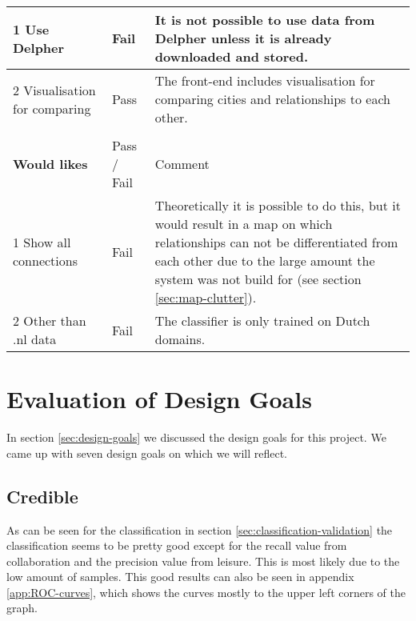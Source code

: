 \begin{table}[H]
\begin{tabular}{ll m{8cm}}
1 Use Delpher                  & Fail        & It is not possible to use data from Delpher unless it is already downloaded and stored.                                                                                                                                               \\ \hline
2 Visualisation for comparing  & Pass        & The front-end includes visualisation for comparing cities and relationships to each other.                                                                                                                                            \\
                               &             &                                                                                                                                                                                                                                       \\
\textbf{Would likes}                    & Pass / Fail & Comment                                                                                                                                                                                                                               \\
1 Show all connections         & Fail        & Theoretically it is possible to do this, but it would result in a map on which relationships can not be differentiated from each other due to the large amount the system was not build for (see section \ref{sec:map-clutter}). \\ \hline
2 Other than .nl data          & Fail        & The classifier is only trained on Dutch domains.                                                                 
\end{tabular}
\end{table}

\section{Evaluation of Design Goals}
In section \ref{sec:design-goals} we discussed the design goals for this project. We came up with seven design goals on which we will reflect.

\subsection{Credible}
As can be seen for the classification in section \ref{sec:classification-validation} the classification seems to be pretty good except for the recall value from collaboration and the precision value from leisure. This is most likely due to the low amount of samples. This good results can also be seen in appendix \ref{app:ROC-curves}, which shows the curves mostly to the upper left corners of the graph.

